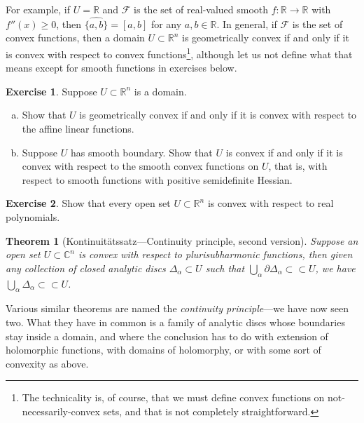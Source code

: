 \documentclass[12pt,openany]{book}
\newcommand{\C}{{\mathbb{C}}}
\newcommand{\R}{{\mathbb{R}}}
\newcommand{\sF}{{\mathscr{F}}}
\theoremstyle{plain}
\newtheorem{thm}{Theorem}[section]
\theoremstyle{remark}
\theoremstyle{definition}
\newenvironment{exbox}{%
    \def\FrameCommand{\vrule width 1pt \relax\hspace{10pt}}%
    \MakeFramed{\advance\hsize-\width\FrameRestore}%
}{%
    \endMakeFramed
}
\newenvironment{exparts}{%
    \leavevmode\begin{enumerate}[a),noitemsep,topsep=0pt,parsep=0pt,partopsep=0pt]
}{%
    \end{enumerate}
}
\theoremstyle{exercise}
\newtheorem{exercise}{Exercise}[section]
\theoremstyle{example}
\begin{document}
For example, if $U=\R$ and $\sF$ is the set of real-valued smooth
$f \colon \R \to \R$ with $f''(x) \geq 0$, then
$\widehat{\{ a, b \}} = [a,b]$ for any $a,b \in \R$.
In general, if $\sF$ is the set of convex functions, then
a domain $U \subset \R^n$ is geometrically convex if and only if it is
convex with respect to convex functions\footnote{%
The technicality is, of course, that we must define convex functions on
not-necessarily-convex sets, and that is not completely straightforward.},
although let us not define
what that means except for smooth functions in exercises below.

\begin{exbox}
\begin{exercise} \label{exercise:geomconvexfuncs}
Suppose $U \subset \R^n$ is a domain.
\begin{exparts}
\item
Show that $U$
is geometrically convex if and only if it is
convex with respect to the affine linear functions.
\item
Suppose $U$
has smooth boundary.
Show that $U$ is
convex if and only if it is
convex with respect to the smooth convex functions on $U$,
that is, with respect to smooth functions with positive semidefinite Hessian.
\end{exparts}
\end{exercise}

\begin{exercise}
Show that every open set $U \subset \R^n$ is convex with respect to real
polynomials.
\end{exercise}
\end{exbox}

\begin{thm}[Kontinuit\"atssatz---Continuity
principle, second version]
\label{thm:contprinciple2}
Suppose an open set $U \subset \C^n$ is convex with respect to plurisubharmonic
functions,
then given any collection of closed analytic discs $\Delta_\alpha \subset U$
such that $\bigcup_\alpha \partial \Delta_\alpha \subset \subset U$,
we have
$\bigcup_\alpha \Delta_\alpha \subset \subset U$.
\end{thm}

Various similar theorems are named the
\emph{continuity principle}---we have now seen two.
What they have in common is a family of analytic discs whose
boundaries stay inside a domain, and where the conclusion has to do
with extension of holomorphic functions, with domains of holomorphy, or
with some sort of convexity as above.
\end{document}
